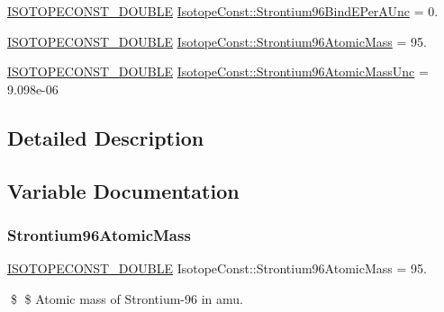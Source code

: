 \begin{DoxyCompactItemize}
\mbox{\hyperlink{group___isotope_const-_macros_ga8f45a7272ce02c0b4c65c44636ed719a}{I\+S\+O\+T\+O\+P\+E\+C\+O\+N\+S\+T\+\_\+\+D\+O\+U\+B\+LE}} \mbox{\hyperlink{group___isotope_const-_strontium-_sr96_gac2f92c97a34c2059afe1d3d9e8e96bf4}{Isotope\+Const\+::\+Strontium96\+Bind\+E\+Per\+A\+Unc}} = 0.
\item 
\mbox{\hyperlink{group___isotope_const-_macros_ga8f45a7272ce02c0b4c65c44636ed719a}{I\+S\+O\+T\+O\+P\+E\+C\+O\+N\+S\+T\+\_\+\+D\+O\+U\+B\+LE}} \mbox{\hyperlink{group___isotope_const-_strontium-_sr96_ga80badf3229b4a0f049a5f2f7d2485e8c}{Isotope\+Const\+::\+Strontium96\+Atomic\+Mass}} = 95.
\item 
\mbox{\hyperlink{group___isotope_const-_macros_ga8f45a7272ce02c0b4c65c44636ed719a}{I\+S\+O\+T\+O\+P\+E\+C\+O\+N\+S\+T\+\_\+\+D\+O\+U\+B\+LE}} \mbox{\hyperlink{group___isotope_const-_strontium-_sr96_ga25a4f13690ab53c6c5c66efffee4eed1}{Isotope\+Const\+::\+Strontium96\+Atomic\+Mass\+Unc}} = 9.\+098e-\/06
\end{DoxyCompactItemize}


\subsection{Detailed Description}


\subsection{Variable Documentation}
\mbox{\label{group___isotope_const-_strontium-_sr96_ga80badf3229b4a0f049a5f2f7d2485e8c}} 
\subsubsection{\texorpdfstring{Strontium96\+Atomic\+Mass}{Strontium96AtomicMass}}
{\footnotesize\ttfamily \mbox{\hyperlink{group___isotope_const-_macros_ga8f45a7272ce02c0b4c65c44636ed719a}{I\+S\+O\+T\+O\+P\+E\+C\+O\+N\+S\+T\+\_\+\+D\+O\+U\+B\+LE}} Isotope\+Const\+::\+Strontium96\+Atomic\+Mass = 95.}

\$ \$ Atomic mass of Strontium-\/96 in amu. \mbox{\label{group___isotope_const-_strontium-_sr96_ga25a4f13690ab53c6c5c66efffee4eed1}} 
